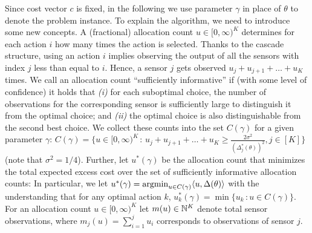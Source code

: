 Since cost vector $c$ is fixed, in the following we use parameter $\gamma$ in place of $\theta$ to denote the problem instance.
To explain the algorithm, we need to introduce some new concepts.
A (fractional) allocation count $u\in [0,\infty)^K$ determines for each action $i$ how many times the
action is selected.
Thanks to the cascade structure, using an action $i$ implies observing the output of all the sensors with index $j$ less than equal to $i$. Hence, a sensor $j$ gets observed $u_j+u_{j+1}+\dots+u_K$ times.
We call an allocation count ``sufficiently informative'' if (with some level of confidence)
it holds that {\em (i)} for each suboptimal choice, 
the number of observations for the corresponding sensor is sufficiently large to distinguish
it from the optimal choice; and  {\em (ii)}  the optimal choice is also distinguishable from the second best choice.
We collect these counts into the set $C(\gamma)$ for a given parameter $\gamma$:
$C(\gamma) = \{ u\in [0,\infty)^K\,:\, 
u_j+u_{j+1}+\dots+u_K
\ge \frac{2\sigma^2}{(\Delta_j^*(\theta))^2}, j\in [K] \}$
(note that $\sigma^2=1/4$).
Further, let $u^*(\gamma)$
be the allocation count that minimizes the total expected excess cost over the set of sufficiently informative allocation counts:
In particular,  we let $u^*(\gamma) = \operatorname{argmin}_{u\in C(\gamma)} \langle  u, \Delta(\theta)  \rangle$ 
with the understanding that for any optimal action $k$, $u_k^*(\gamma) = \min \{ u_k \,: u\in C(\gamma) \}$.
For an allocation count $u\in [0,\infty)^K$ let $m(u)\in \mathbb{N}^K$ denote total sensor observations, where $m_j(u) = \sum_{i=1}^j u_i$ corresponds to observations of sensor $j$.


